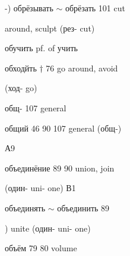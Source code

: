 \begin{minipage}[t]{0.475\textwidth}
\noindent -)  обрёзывать $\sim$ обрёзать 101 cut\par
\noindent around, sculpt (рез- cut)\par
\noindent обучить pf. of учить\par
\noindent обходйть $\dagger$ 76 go around, avoid\par
\noindent (ход- go)\par
{} общ- 107 general\par
{} общий 46 90 107 general (общ-)\par
\noindent А9\par
\noindent объединёние 89 90 union, join\par
\noindent (один- uni- one) В1\par
\noindent объединять $\sim$ объединить 89\par
\noindent ) unite (один- uni- one)\par
\noindent объём 79 80 volume\par
\end{minipage}
\endgroup

